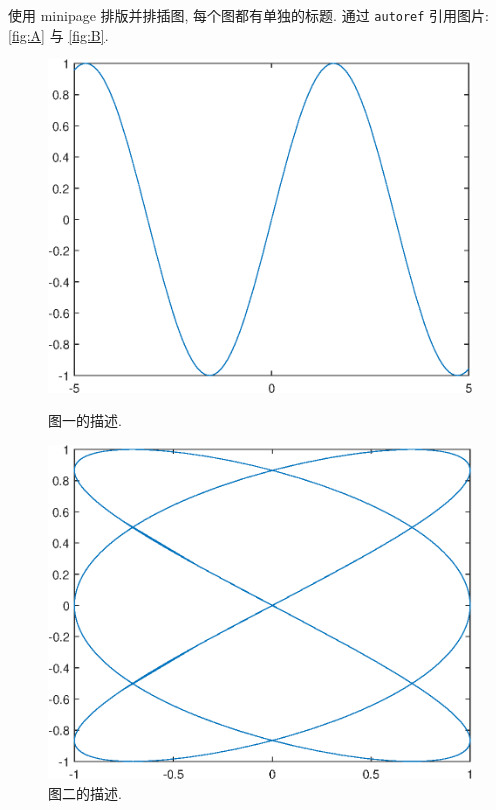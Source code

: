 \documentclass[UTF8,openany]{ctexbook}
\numberwithin{equation}{chapter}
\numberwithin{figure}{chapter}
\numberwithin{table}{chapter}
\theoremstyle{mystyle}
\begin{document}
使用 minipage 排版并排插图, 每个图都有单独的标题. 通过 \verb|autoref| 引用图片: \autoref{fig:A} 与 \autoref{fig:B}.
\begin{figure}[htp!]
\begin{minipage}[t]{0.48\linewidth}
  \centering
  \includegraphics[width=0.9\linewidth]{image1}
  \caption{图一的描述.}
  \label{fig:A}
\end{minipage}
\hfill
\begin{minipage}[t]{0.48\linewidth}
\centering
   \includegraphics[width=0.9\linewidth]{image2}
   \caption{图二的描述.}
   \label{fig:B}
\end{minipage}
\end{figure}

\end{document}
